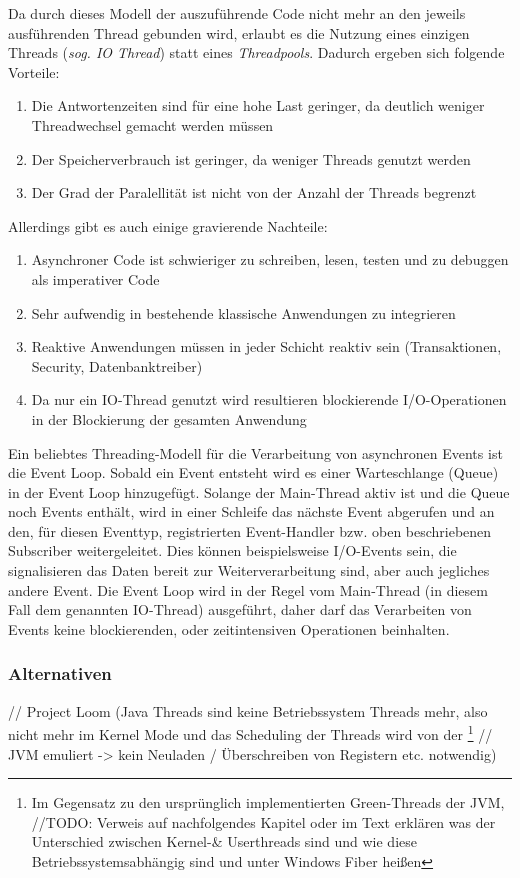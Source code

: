 Da durch dieses Modell der auszuführende Code nicht mehr an den jeweils ausführenden Thread gebunden wird, erlaubt es die Nutzung eines einzigen
Threads (\textit{sog. IO Thread}) statt eines \textit{Threadpools}.
Dadurch ergeben sich folgende Vorteile:

\begin{enumerate}
    \item Die Antwortenzeiten sind für eine hohe Last geringer, da deutlich weniger Threadwechsel gemacht werden müssen
    \item Der Speicherverbrauch ist geringer, da weniger Threads genutzt werden
    \item Der Grad der Paralellität ist nicht von der Anzahl der Threads begrenzt
\end{enumerate}

Allerdings gibt es auch einige gravierende Nachteile:

\begin{enumerate}
    \item Asynchroner Code ist schwieriger zu schreiben, lesen, testen und zu debuggen als imperativer Code
    \item Sehr aufwendig in bestehende klassische Anwendungen zu integrieren
    \item Reaktive Anwendungen müssen in jeder Schicht reaktiv sein (Transaktionen, Security, Datenbanktreiber)
    \item Da nur ein IO-Thread genutzt wird resultieren blockierende I/O-Operationen in der Blockierung der gesamten Anwendung
\end{enumerate}

Ein beliebtes Threading-Modell für die Verarbeitung von asynchronen Events ist die Event Loop. Sobald ein Event entsteht wird es einer Warteschlange (Queue)
in der Event Loop hinzugefügt. Solange der Main-Thread aktiv ist und die Queue noch Events enthält, wird in einer Schleife das nächste Event
abgerufen und an den, für diesen Eventtyp, registrierten Event-Handler bzw. oben beschriebenen Subscriber weitergeleitet.
Dies können beispielsweise I/O-Events sein, die signalisieren das Daten bereit zur Weiterverarbeitung sind, aber auch jegliches andere Event.
Die Event Loop wird in der Regel vom Main-Thread (in diesem Fall dem genannten IO-Thread) ausgeführt, daher darf das Verarbeiten von Events
keine blockierenden, oder zeitintensiven Operationen beinhalten\parencite{Ponge2020}.

\subsubsection{Alternativen}
// Project Loom (Java Threads sind keine Betriebssystem Threads mehr, also nicht mehr im Kernel Mode und das Scheduling der Threads wird von der
\footnote{Im Gegensatz zu den ursprünglich implementierten Green-Threads der JVM,
    //TODO: Verweis auf nachfolgendes Kapitel oder im Text erklären was der Unterschied zwischen
    Kernel-\& Userthreads sind und wie diese Betriebssystemsabhängig sind und unter Windows Fiber heißen}
// JVM emuliert -> kein Neuladen / Überschreiben von Registern etc. notwendig)
\parencite{Oracle2021}
